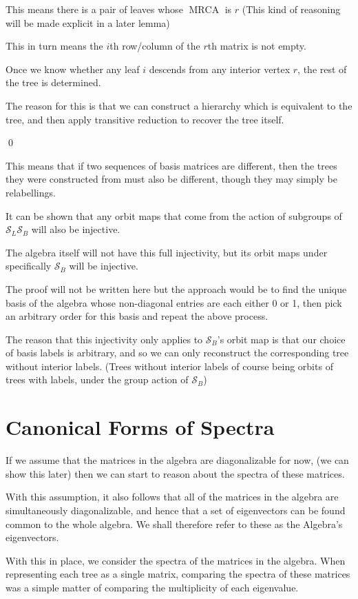 \documentclass[10pt,a4paper]{report}
\DeclareMathOperator{\MRCA}{MRCA}
\newcommand{\Sym}{\mathcal{S}}
\begin{document}
This means there is a pair of leaves whose $\MRCA$ is $r$ (This kind of
reasoning will be made explicit in a later lemma)

This in turn means the $i$th row/column of the $r$th matrix is not empty.

Once we know whether any leaf $i$ descends from any interior vertex $r$, the
rest of the tree is determined.

The reason for this is that we can construct a hierarchy which is equivalent to
the tree, and then apply transitive reduction to recover the tree itself.

\qed

This means that if two sequences of basis matrices are different, then the
trees they were constructed from must also be different, though they may simply
be relabellings.

It can be shown that any orbit maps that come from the action of subgroups of
$\Sym_L\Sym_B$ will also be injective.

The algebra itself will not have this full injectivity, but its orbit maps
under specifically $\Sym_B$ will be injective.

The proof will not be written here but the approach would be to find the unique
basis of the algebra whose non-diagonal entries are each either 0 or 1, then
pick an arbitrary order for this basis and repeat the above process.

The reason that this injectivity only applies to $\Sym_B$'s orbit map is that
our choice of basis labels is arbitrary, and so we can only reconstruct the
corresponding tree without interior labels. (Trees without interior labels of
course being orbits of trees with labels, under the group action of $\Sym_B$)

\section{Canonical Forms of Spectra}

If we assume that the matrices in the algebra are diagonalizable for now, (we
can show this later) then we can start to reason about the spectra of these
matrices.

With this assumption, it also follows that all of the matrices in the algebra
are simultaneously diagonalizable, and hence that a set of eigenvectors can be
found common to the whole algebra.
We shall therefore refer to these as the Algebra's eigenvectors.

With this in place, we consider the spectra of the matrices in the algebra.
When representing each tree as a single matrix, comparing the spectra of these
matrices was a simple matter of comparing the multiplicity of each eigenvalue.
\end{document}
